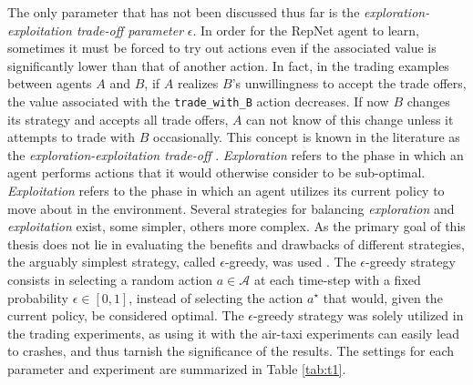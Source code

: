 The only parameter that has not been discussed thus far is the \textit{exploration-exploitation trade-off parameter} $\epsilon$. In order for the RepNet agent to learn, sometimes it must be forced to try out actions even if the associated value is significantly lower than that of another action. In fact, in the trading examples between agents $A$ and $B$, if $A$ realizes $B$'s unwillingness to accept the trade offers, the value associated with the \texttt{trade\_with\_B} action decreases. If now $B$ changes its strategy and accepts all trade offers, $A$ can not know of this change unless it attempts to trade with $B$ occasionally. This concept is known in the literature as the \textit{exploration-exploitation trade-off} \cite{cassano2019isl}. \textit{Exploration} refers to the phase in which an agent performs actions that it would otherwise consider to be sub-optimal. \textit{Exploitation} refers to the phase in which an agent utilizes its current policy to move about in the environment. Several strategies for balancing \textit{exploration} and \textit{exploitation} exist, some simpler, others more complex. As the primary goal of this thesis does not lie in evaluating the benefits and drawbacks of different strategies, the arguably simplest strategy, called $\epsilon$-greedy, was used \cite{epsi}. The $\epsilon$-greedy strategy consists in selecting a random action $a \in \mathcal{A}$ at each time-step with a fixed probability $\epsilon \in [0,1]$, instead of selecting the action $a^\star$ that would, given the current policy, be considered optimal. The $\epsilon$-greedy strategy was solely utilized in the trading experiments, as using it with the air-taxi experiments can easily lead to crashes, and thus tarnish the significance of the results.
The settings for each parameter and experiment are summarized in Table \ref{tab:t1}.
